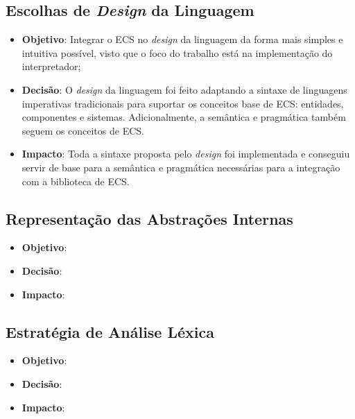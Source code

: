 \subsection{Escolhas de \textit{Design} da Linguagem}

\begin{itemize}
	\item \textbf{Objetivo}: Integrar o ECS no \textit{design} da linguagem da forma mais simples e intuitiva possível, visto que o foco do trabalho está na implementação do interpretador;
	\item \textbf{Decisão}: O \textit{design} da linguagem foi feito adaptando a sintaxe de linguagens imperativas tradicionais para suportar os conceitos base de ECS: entidades, componentes e sistemas. Adicionalmente, a semântica e pragmática também seguem os conceitos de ECS.
	\item \textbf{Impacto}: Toda a sintaxe proposta pelo \textit{design} foi implementada e conseguiu servir de base para a semântica e pragmática necessárias para a integração com a biblioteca de ECS.
\end{itemize}

\subsection{Representação das Abstrações Internas}

\begin{itemize}
	\item \textbf{Objetivo}:
	\item \textbf{Decisão}:
	\item \textbf{Impacto}:
\end{itemize}

\subsection{Estratégia de Análise Léxica}

\begin{itemize}
	\item \textbf{Objetivo}:
	\item \textbf{Decisão}:
	\item \textbf{Impacto}:
\end{itemize}

